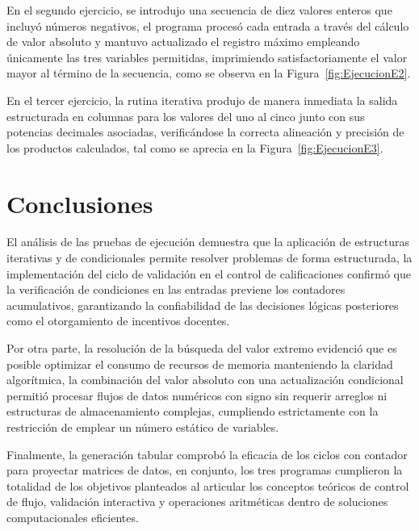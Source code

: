 En el segundo ejercicio, se introdujo una secuencia de diez valores enteros que incluyó números negativos, el programa procesó cada entrada a través del cálculo de valor absoluto y mantuvo actualizado el registro máximo empleando únicamente las tres variables permitidas, imprimiendo satisfactoriamente el valor mayor al término de la secuencia, como se observa en la Figura~\ref{fig:EjecucionE2}.


En el tercer ejercicio, la rutina iterativa produjo de manera inmediata la salida estructurada en columnas para los valores del uno al cinco junto con sus potencias decimales asociadas, verificándose la correcta alineación y precisión de los productos calculados, tal como se aprecia en la Figura~\ref{fig:EjecucionE3}.


\section{Conclusiones}

El análisis de las pruebas de ejecución demuestra que la aplicación de estructuras iterativas y de condicionales permite resolver problemas de forma estructurada, la implementación del ciclo de validación en el control de calificaciones confirmó que la verificación de condiciones en las entradas previene los contadores acumulativos, garantizando la confiabilidad de las decisiones lógicas posteriores como el otorgamiento de incentivos docentes.


Por otra parte, la resolución de la búsqueda del valor extremo evidenció que es posible optimizar el consumo de recursos de memoria manteniendo la claridad algorítmica, la combinación del valor absoluto con una actualización condicional permitió procesar flujos de datos numéricos con signo sin requerir arreglos ni estructuras de almacenamiento complejas, cumpliendo estrictamente con la restricción de emplear un número estático de variables.


Finalmente, la generación tabular comprobó la eficacia de los ciclos con contador para proyectar matrices de datos, en conjunto, los tres programas cumplieron la totalidad de los objetivos planteados al articular los conceptos teóricos de control de flujo, validación interactiva y operaciones aritméticas dentro de soluciones computacionales eficientes.

\printbibliography

